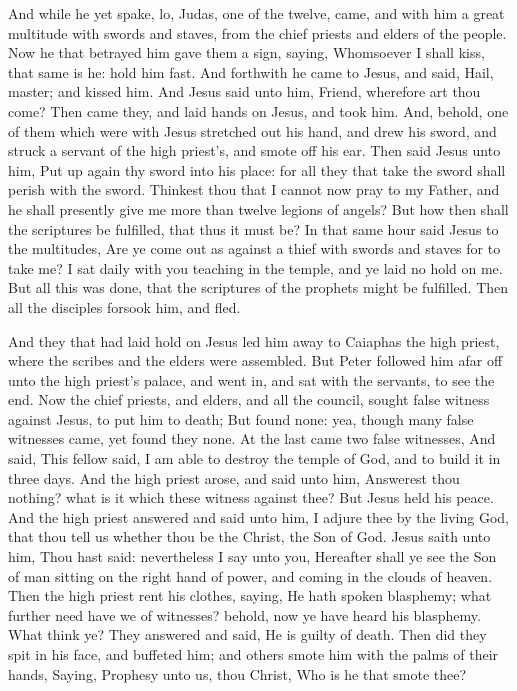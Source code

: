  And while he yet spake, lo, Judas, one of the twelve,
came, and with him a great multitude with swords and staves, from the
chief priests and elders of the people.  Now he that
betrayed him gave them a sign, saying, Whomsoever I shall kiss, that
same is he: hold him fast.  And forthwith he came to Jesus,
and said, Hail, master; and kissed him.  And Jesus said
unto him, Friend, wherefore art thou come? Then came they, and laid
hands on Jesus, and took him.  And, behold, one of them
which were with Jesus stretched out his hand, and drew his sword, and
struck a servant of the high priest's, and smote off his ear.
 Then said Jesus unto him, Put up again thy sword into his
place: for all they that take the sword shall perish with the sword.
 Thinkest thou that I cannot now pray to my Father, and he
shall presently give me more than twelve legions of angels?
 But how then shall the scriptures be fulfilled, that thus
it must be?  In that same hour said Jesus to the
multitudes, Are ye come out as against a thief with swords and staves
for to take me? I sat daily with you teaching in the temple, and ye laid
no hold on me.  But all this was done, that the scriptures
of the prophets might be fulfilled. Then all the disciples forsook him,
and fled.

 And they that had laid hold on Jesus led him away to
Caiaphas the high priest, where the scribes and the elders were
assembled.  But Peter followed him afar off unto the high
priest's palace, and went in, and sat with the servants, to see the end.
 Now the chief priests, and elders, and all the council,
sought false witness against Jesus, to put him to death; 
But found none: yea, though many false witnesses came, yet found they
none. At the last came two false witnesses,  And said, This
fellow said, I am able to destroy the temple of God, and to build it in
three days.  And the high priest arose, and said unto him,
Answerest thou nothing? what is it which these witness against thee?
 But Jesus held his peace. And the high priest answered and
said unto him, I adjure thee by the living God, that thou tell us
whether thou be the Christ, the Son of God.  Jesus saith
unto him, Thou hast said: nevertheless I say unto you, Hereafter shall
ye see the Son of man sitting on the right hand of power, and coming in
the clouds of heaven.  Then the high priest rent his
clothes, saying, He hath spoken blasphemy; what further need have we of
witnesses? behold, now ye have heard his blasphemy.  What
think ye? They answered and said, He is guilty of death. 
Then did they spit in his face, and buffeted him; and others smote him
with the palms of their hands,  Saying, Prophesy unto us,
thou Christ, Who is he that smote thee?

